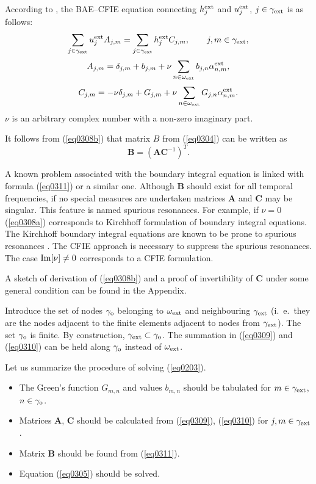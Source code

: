 \documentclass[12pt]{article}
\newcommand{\rex}{{\rm ext}}
\newcommand{\A}{\mathbf{A}}
\newcommand{\B}{\mathbf{B}}
\newcommand{\C}{\mathbf{C}}
\begin{document}
According to \cite{poblet-PVS:2015}, the BAE--CFIE equation connecting $h^\rex_j$ and $u^\rex_j$, $j \in \gamma_\rex$ is as
follows:
\begin{equation}
\sum_{j \in \gamma_\rex} u^\rex_j A_{j,m} =
\sum_{j \in \gamma_\rex} h^\rex_j
C_{j,m},
\qquad
j,m \in \gamma_\rex,
\label{eq0308b}
\end{equation}
\begin{equation}
A_{j,m} = \delta_{j,m} + b_{j,m} + \nu \sum_{n \in \omega_\rex} b_{j,n} \alpha_{n,m}^\rex ,
\label{eq0309}
\end{equation}
\begin{equation}
C_{j,m} =
- \nu \delta_{j,m} + G_{j,m} + \nu \sum_{n \in \omega_\rex}G_{j,n} \alpha_{n,m}^\rex.
\label{eq0310}
\end{equation}
$\nu$ is an arbitrary complex number with a non-zero imaginary part.

It follows from (\ref{eq0308b}) that matrix $B$ from (\ref{eq0304}) can be written as
\begin{equation}
\B = (\A \C^{-1})^T.
\label{eq0311}
\end{equation}

A known problem associated with the boundary integral equation is linked with formula (\ref{eq0311}) or a similar one. Although $\B$ should exist for all temporal frequencies, if no special measures are undertaken
matrices $\A$ and $\C$ may be singular. This feature is named spurious resonances. For example,
if $\nu =0$ (\ref{eq0308a}) corresponds to Kirchhoff formulation of boundary integral equations.
The Kirchhoff boundary integral equations are known to be prone to spurious resonances \cite{Schenck:41,Benthien-Schenck:1997,chien:1990}.
The CFIE approach is necessary to suppress the spurious resonances. The case ${\rm Im}[\nu] \ne 0$
corresponds to a CFIE formulation.

A sketch of derivation of (\ref{eq0308b}) and a proof of invertibility of $\C$ under some general condition
can be found in the Appendix.

Introduce the set of nodes $\gamma_{\rm o}$ belonging to $\omega_\rex$ and neighbouring $\gamma_\rex$
(i.~e.\ they are the nodes adjacent to the finite elements adjacent to nodes from $\gamma_\rex$).
The set $\gamma_{\rm o}$ is finite. By construction, $\gamma_\rex \subset \gamma_{\rm o}$. The summation
in (\ref{eq0309}) and (\ref{eq0310}) can be held along $\gamma_{\rm o}$ instead of $\omega_\rex$.

Let us summarize the procedure of solving (\ref{eq0203}).
\begin{itemize}
\item
The Green's function $G_{m,n}$ and values $b_{m,n}$ should be tabulated for
$m\in \gamma_\rex$, $n \in \gamma_{\rm o}$.
\item
Matrices $\A$, $\C$ should be calculated from (\ref{eq0309}), (\ref{eq0310}) for $j,m \in \gamma_\rex$.
\item
Matrix $\B$ should be found from (\ref{eq0311}).
\item
Equation (\ref{eq0305}) should be solved.
\end{itemize}
\end{document}
